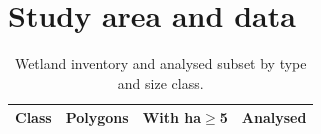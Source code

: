 \documentclass[review]{elsarticle}
\begin{document}

\section{Study area and data}\label{sec:data}


\begin{table}[t]\centering
\caption{Wetland inventory and analysed subset by type and size class.}
\label{tab:inventory}
\begin{tabular}{lrrr}
\toprule
Class & Polygons & With ha$\ge$5 & Analysed \\
\midrule
\bottomrule
\end{tabular}
\end{table}

\end{document}
